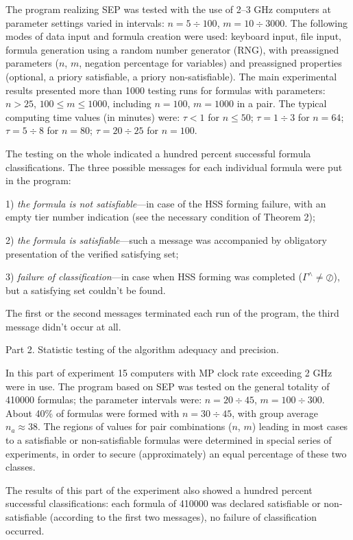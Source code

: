 \documentclass[12pt, a4paper]{article}
\begin{document}
The program realizing SEP was tested with the use of 2--3 GHz computers at parameter settings varied in intervals: $n=5\div 100$, $m=10\div 3000$.  The following modes of  data input and formula creation were used: keyboard input, file input, formula generation using a random number generator (RNG), with preassigned parameters ($n$, $m$, negation percentage for variables) and preassigned properties (optional, a priory satisfiable, a priory non-satisfiable). The main experimental
results presented more than 1000 testing runs for formulas with parameters: $n > 25$, $100 \le m \le 1000$, including  $n = 100$,  $m = 1000$ in a pair. The typical computing time values (in minutes) were: $\tau<1$ for $n\le 50$; $\tau=1\div 3$ for $n=64$; $\tau=5\div 8$ for $n=80$; $\tau=20\div 25$ for $n=100$.

The testing on the whole indicated a hundred percent successful formula classifications. The three possible messages for each individual formula were put in the program:

\hangindent=1.1cm 
1) {\it the formula is not satisfiable}---in case of the HSS forming failure, with an empty tier number indication (see the necessary condition of Theorem 2);

\hangindent=1.1cm
2) {\it the formula is satisfiable}---such a message was accompanied by obligatory presentation of the verified satisfying set;

\hangindent=1.1cm
3) {\it failure of classification}---in case when HSS forming was completed ($\Gamma^\wedge \ne \oslash$), but a satisfying set couldn't be found.

The first or the second messages terminated each run of the program, the third message didn't occur at all.

\smallskip
Part 2. Statistic testing of the algorithm adequacy and precision.

In this part of experiment 15 computers with MP clock rate exceeding 2 GHz were in use.
The program based on SEP was tested on the general totality of 410000 formulas; the parameter
intervals were: $n=20\div 45$, $m=100\div 300$. About 40\% of formulas were formed with
$n = 30\div 45$, with group average  $n_a \approx 38$. The regions of values for pair combinations ($n$, $m$) leading in most cases to a satisfiable or non-satisfiable formulas were determined in special series of experiments, in order to secure (approximately) an equal percentage of these two classes.

The results of this part of the experiment also showed a hundred percent successful classifications: each formula of 410000 was declared satisfiable or non-satisfiable (according to the first two messages), no failure of classification occurred.
\end{document}
